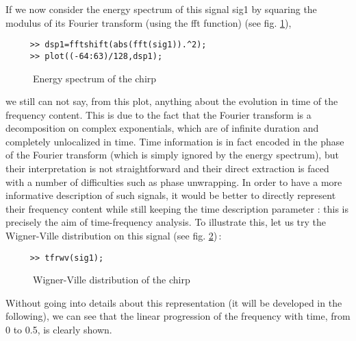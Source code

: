 If we now consider the energy spectrum of this signal {\ttfamily sig1} by
squaring the modulus of its Fourier transform (using the {\ttfamily fft}
function) (see fig. \ref{In2fig2}),
\begin{verbatim}
     >> dsp1=fftshift(abs(fft(sig1)).^2); 
     >> plot((-64:63)/128,dsp1);        
\end{verbatim}
\begin{figure}[htb]
\epsfxsize=10cm
\epsfysize=6cm
\centerline{}
\caption{\label{In2fig2}Energy spectrum of the chirp}
\end{figure}
we still can not say, from this plot, anything about the evolution in time
of the frequency content. This is due to the fact that the Fourier
transform is a decomposition on complex exponentials, which are of infinite
duration and completely unlocalized in time. Time information is in fact
encoded in the phase of the Fourier transform (which is simply ignored by
the energy spectrum), but their interpretation is not straightforward and
their direct extraction is faced with a number of difficulties such as
phase unwrapping.  In order to have a more informative description of such
signals, it would be better to directly represent their frequency content
while still keeping the time description parameter : this is precisely the
aim of time-frequency analysis. To illustrate this, let us try the
Wigner-Ville distribution on this signal (see fig. \ref{In2fig3})\,:
\begin{verbatim}
     >> tfrwv(sig1);
\end{verbatim}
\begin{figure}[htb]
\epsfxsize=10cm
\epsfysize=8cm
\centerline{}
\caption{\label{In2fig3}Wigner-Ville distribution of the chirp}
\end{figure}
Without going into details about this representation (it will be developed
in the following), we can see that the linear progression of the frequency
with time, from 0 to 0.5, is clearly shown.

